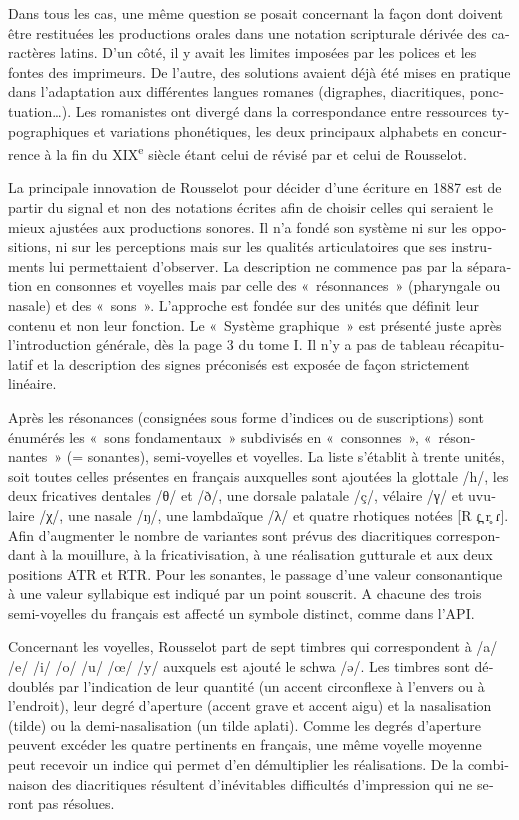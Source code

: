 \documentclass[french,output=paper,colorlinks,citecolor=brown]{../langscibook}
\begin{document}
\begin{otherlanguage}{french}
Dans tous les cas, une même question se posait concernant la façon dont doivent être restituées les productions orales dans une notation scripturale dérivée des caractères latins. D’un côté, il y avait les limites imposées par les polices et les fontes des imprimeurs. De l’autre, des solutions avaient déjà été mises en pratique dans l’adaptation aux différentes langues romanes (digraphes, diacritiques, ponctuation…). Les romanistes ont divergé dans la correspondance entre ressources typographiques et variations phonétiques, les deux principaux alphabets en concurrence à la fin du XIX\textsuperscript{e} siècle étant celui de \citet{Böhmer1871} révisé par \citet{Ascoli1873} et celui de Rousselot.

La principale innovation de Rousselot pour décider d’une écriture en 1887 est de partir du signal et non des notations écrites afin de choisir celles qui seraient le mieux ajustées aux productions sonores. Il n’a fondé son système ni sur les oppositions, ni sur les perceptions mais sur les qualités articulatoires que ses instruments lui permettaient d’observer. La description ne commence pas par la séparation en consonnes et voyelles mais par celle des «~résonnances~» (pharyngale ou nasale) et des «~sons~». L’approche est fondée sur des unités que définit leur contenu et non leur fonction. Le «~Système graphique~» est présenté juste après l’introduction générale, dès la page 3 du tome I. Il n’y a pas de tableau récapitulatif et la description des signes préconisés est exposée de façon strictement linéaire.

Après les résonances (consignées sous forme d’indices ou de suscriptions) sont énumérés les «~sons fondamentaux~» subdivisés en «~consonnes~», «~résonnantes~» (= sonantes), semi-voyelles et voyelles. La liste s’établit à trente unités, soit toutes celles présentes en français auxquelles sont ajoutées la glottale /h/, les deux fricatives dentales /θ/ et /ð/, une dorsale palatale /ç/, vélaire /γ/ et uvulaire /χ/, une nasale /ŋ/, une lambdaïque /λ/ et quatre rhotiques notées [R \textlatin{ɾ}\textlatin{̪} r\textlatin{̥} \textlatin{ɾ}]. Afin d’augmenter le nombre de variantes sont prévus des diacritiques correspondant à la mouillure, à la fricativisation, à une réalisation gutturale et aux deux positions ATR et RTR. Pour les sonantes, le passage d’une valeur consonantique à une valeur syllabique est indiqué par un point souscrit. A chacune des trois semi-voyelles du français est affecté un symbole distinct, comme dans l’API.

Concernant les voyelles, Rousselot part de sept timbres qui correspondent à /a/ /e/ /i/ /o/ /u/ /œ/ /y/ auxquels est ajouté le schwa /\textlatin{ə}/. Les timbres sont dédoublés par l’indication de leur quantité (un accent circonflexe à l’envers ou à l’endroit), leur degré d’aperture (accent grave et accent aigu) et la nasalisation (tilde) ou la demi-nasalisation (un tilde aplati). Comme les degrés d’aperture peuvent excéder les quatre pertinents en français, une même voyelle moyenne peut recevoir un indice qui permet d’en démultiplier les réalisations. De la combinaison des diacritiques résultent d’inévitables difficultés d’impression qui ne seront pas résolues.


\end{otherlanguage}
\end{document}
